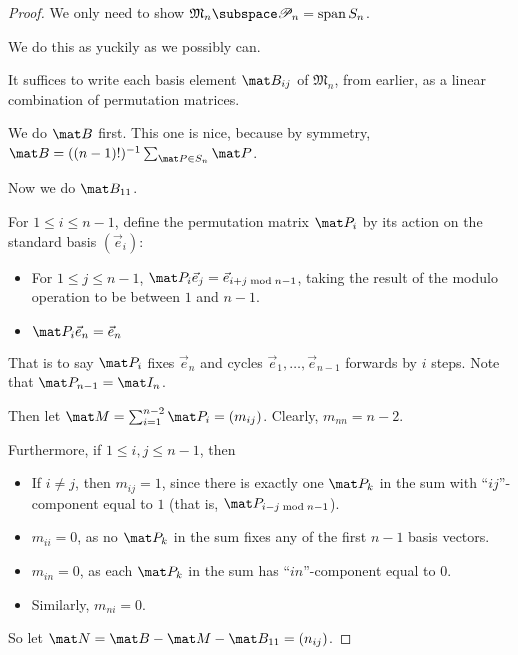\documentclass[a4paper,12pt]{article}
\begin{document}
\begin{proof}
 We only need to show \(\mathfrak M_n \subspace \mathscr P_n = \Span S_n\).

 We do this as yuckily as we possibly can.

 It suffices to write each basis element \(\mat B_{ij}\) of \(\mathfrak M_n\),
 from earlier, as a linear combination of permutation matrices.

 We do \(\mat B\) first. This one is nice, because by symmetry,
 \(\mat B = ((n - 1)!)^{-1} \sum_{\mat P \in S_n} \mat P\).

 Now we do \(\mat B_{11}\).

 For \(1 \le i \le n - 1\), define the permutation matrix \(\mat P_i\) by its
 action on the standard basis \((\vec e_i)\):
 \begin{itemize}
  \item
   For \(1 \le j \le n - 1\),
   \(\mat P_i \vec e_j = \vec e_{i + j \bmod n - 1}\), taking the result of the
   modulo operation to be between \(1\) and \(n - 1\).
  \item
   \(\mat P_i \vec e_n = \vec e_n\)
 \end{itemize}
 That is to say \(\mat P_i\) fixes \(\vec e_n\) and cycles
 \(\vec e_1, \dotsc, \vec e_{n - 1}\) forwards by \(i\) steps. Note that
 \(\mat P_{n - 1} = \mat I_n\).

 Then let \(\mat M = \sum_{i = 1}^{n - 2} \mat P_i = (m_{ij})\).
 Clearly, \(m_{nn} = n - 2\).

 Furthermore, if \(1 \le i, j \le n - 1\), then
 \begin{itemize}
  \item
   If \(i \ne j\), then \(m_{ij} = 1\), since there is exactly one \(\mat P_k\)
   in the sum with ``\(ij\)''-component equal to \(1\)
   (that is, \(\mat P_{i - j \bmod n - 1}\)).
  \item
   \(m_{ii} = 0\), as no \(\mat P_k\) in the sum fixes any of the first
   \(n - 1\) basis vectors.
  \item
   \(m_{in} = 0\), as each \(\mat P_k\) in the sum has ``\(in\)''-component
   equal to \(0\).
  \item
   Similarly, \(m_{ni} = 0\).
 \end{itemize}
 So let \(\mat N = \mat B - \mat M - \mat B_{11} = (n_{ij})\).


\end{proof}
\end{document}
